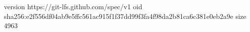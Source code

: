 version https://git-lfs.github.com/spec/v1
oid sha256:e2f556df04ab9e5ffc561ac915f1f37dd99f3fa4f98da2b81ca6c381e0eb2a9e
size 4963

